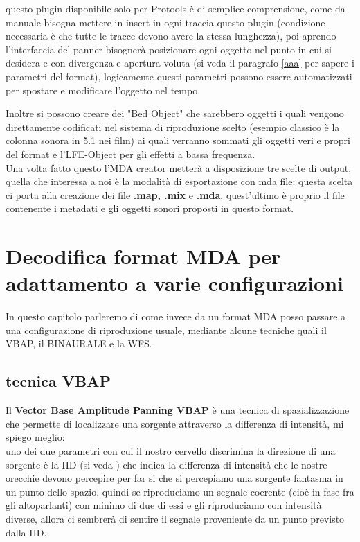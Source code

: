 \documentclass[12pt,a4paper]{report}
\begin{document}
questo plugin disponibile solo per Protools è di semplice comprensione, come da manuale bisogna mettere in insert in ogni traccia questo plugin (condizione necessaria è che tutte le tracce devono avere la stessa lunghezza), poi aprendo l'interfaccia del panner bisognerà posizionare ogni oggetto nel punto in cui si desidera e con divergenza e apertura voluta (si veda il paragrafo \ref{aaa} per sapere i parametri del format), logicamente questi parametri possono essere automatizzati per spostare e modificare l'oggetto nel tempo.

Inoltre si possono creare dei "Bed Object" che sarebbero oggetti i quali vengono direttamente codificati nel sistema di riproduzione scelto (esempio classico è la colonna sonora in 5.1 nei film) ai quali verranno sommati gli oggetti veri e propri del format e l'LFE-Object per gli effetti a bassa frequenza.\\

Una volta fatto questo l'MDA creator metterà a disposizione tre scelte di output, quella che interessa a noi è la modalità di esportazione con mda file: questa scelta ci porta alla creazione dei file \textbf{.map, .mix} e \textbf{.mda}, quest'ultimo è proprio il file contenente i metadati e gli oggetti sonori proposti in questo format.


\chapter{Decodifica format MDA per adattamento a varie configurazioni}

In questo capitolo parleremo di come invece da un format MDA posso passare a una configurazione di riproduzione usuale, mediante alcune tecniche quali il VBAP, il BINAURALE e la WFS.\\

\section{tecnica VBAP}

Il \textbf{Vector Base Amplitude Panning VBAP} è una tecnica di spazializzazione che permette di localizzare una sorgente attraverso la differenza di intensità, mi spiego meglio:\\
uno dei due parametri con cui il nostro cervello discrimina la direzione di una sorgente è la IID (si veda \cite{iid}) che indica la differenza di intensità che le nostre orecchie devono percepire per far si che si percepiamo una sorgente fantasma in un punto dello spazio, quindi se riproduciamo un segnale coerente (cioè in fase fra gli altoparlanti) con minimo di due di essi e gli riproduciamo con intensità diverse, allora ci sembrerà di sentire il segnale proveniente da un punto previsto dalla IID.\\
\end{document}
